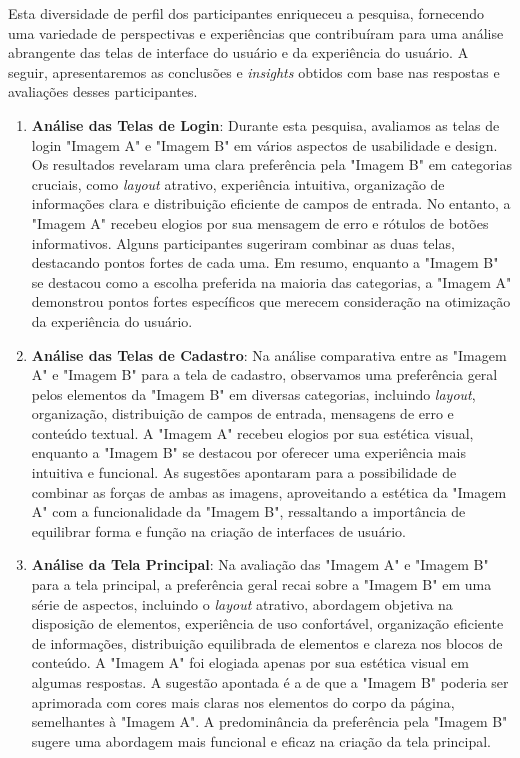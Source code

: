 Esta diversidade de perfil dos participantes enriqueceu a pesquisa, fornecendo uma variedade de perspectivas e experiências que contribuíram para uma análise abrangente das telas de interface do usuário e da experiência do usuário. A seguir, apresentaremos as conclusões e \textit{insights} obtidos com base nas respostas e avaliações desses participantes.

\begin{enumerate}
    \item \textbf{Análise das Telas de Login}: Durante esta pesquisa, avaliamos as telas de login "Imagem A" e "Imagem B" em vários aspectos de usabilidade e design. Os resultados revelaram uma clara preferência pela "Imagem B" em categorias cruciais, como \textit{layout} atrativo, experiência intuitiva, organização de informações clara e distribuição eficiente de campos de entrada. No entanto, a "Imagem A" recebeu elogios por sua mensagem de erro e rótulos de botões informativos. Alguns participantes sugeriram combinar as duas telas, destacando pontos fortes de cada uma. Em resumo, enquanto a "Imagem B" se destacou como a escolha preferida na maioria das categorias, a "Imagem A" demonstrou pontos fortes específicos que merecem consideração na otimização da experiência do usuário.
    
    \item \textbf{Análise das Telas de Cadastro}: Na análise comparativa entre as "Imagem A" e "Imagem B" para a tela de cadastro, observamos uma preferência geral pelos elementos da "Imagem B" em diversas categorias, incluindo \textit{layout}, organização, distribuição de campos de entrada, mensagens de erro e conteúdo textual. A "Imagem A" recebeu elogios por sua estética visual, enquanto a "Imagem B" se destacou por oferecer uma experiência mais intuitiva e funcional. As sugestões apontaram para a possibilidade de combinar as forças de ambas as imagens, aproveitando a estética da "Imagem A" com a funcionalidade da "Imagem B", ressaltando a importância de equilibrar forma e função na criação de interfaces de usuário.
    
    \item \textbf{Análise da Tela Principal}: Na avaliação das "Imagem A" e "Imagem B" para a tela principal, a preferência geral recai sobre a "Imagem B" em uma série de aspectos, incluindo o \textit{layout} atrativo, abordagem objetiva na disposição de elementos, experiência de uso confortável, organização eficiente de informações, distribuição equilibrada de elementos e clareza nos blocos de conteúdo. A "Imagem A" foi elogiada apenas por sua estética visual em algumas respostas. A sugestão apontada é a de que a "Imagem B" poderia ser aprimorada com cores mais claras nos elementos do corpo da página, semelhantes à "Imagem A". A predominância da preferência pela "Imagem B" sugere uma abordagem mais funcional e eficaz na criação da tela principal.
    

\end{enumerate}
